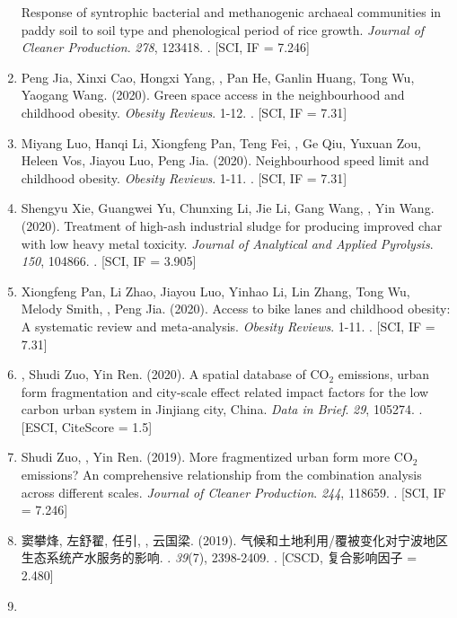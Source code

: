 \begin{enumerate}
    Response of syntrophic bacterial and methanogenic archaeal communities in paddy soil to soil type and phenological period of rice growth.
    \textit{Journal of Cleaner Production}. \textit{278}, 123418.
    . [SCI, IF = 7.246]
\item
    Peng Jia, Xinxi Cao, Hongxi Yang, \Shaoqing, Pan He, Ganlin Huang, Tong Wu, Yaogang Wang. (2020).
    Green space access in the neighbourhood and childhood obesity.
    \textit{Obesity Reviews}. 1-12.
    . [SCI, IF = 7.31]
\item
    Miyang Luo, Hanqi Li, Xiongfeng Pan, Teng Fei, \Shaoqing, Ge Qiu, Yuxuan Zou, Heleen Vos, Jiayou Luo, Peng Jia. (2020).
    Neighbourhood speed limit and childhood obesity.
    \textit{Obesity Reviews}. 1-11.
    . [SCI, IF = 7.31]
\item
    Shengyu Xie, Guangwei Yu, Chunxing Li, Jie Li, Gang Wang, \Shaoqing, Yin Wang. (2020).
    Treatment of high-ash industrial sludge for producing improved char with low heavy metal toxicity.
    \textit{Journal of Analytical and Applied Pyrolysis}. \textit{150}, 104866.
    . [SCI, IF = 3.905]
\item
    Xiongfeng Pan, Li Zhao, Jiayou Luo, Yinhao Li, Lin Zhang, Tong Wu, Melody Smith, \Shaoqing, Peng Jia. (2020).
    Access to bike lanes and childhood obesity: A systematic review and meta‐analysis.
    \textit{Obesity Reviews}. 1-11.
    . [SCI, IF = 7.31]
\item
    \Shaoqing, Shudi Zuo, Yin Ren. (2020).
    A spatial database of CO$_2$ emissions, urban form fragmentation and city-scale effect related impact factors for the low carbon urban system in Jinjiang city, China.
    \textit{Data in Brief}. \textit{29}, 105274.
    . [ESCI, CiteScore = 1.5]
\item
    Shudi Zuo, \Shaoqing, Yin Ren. (2019).
    More fragmentized urban form more CO$_2$ emissions? An comprehensive relationship from the combination analysis across different scales.
    \textit{Journal of Cleaner Production}. \textit{244}, 118659.
    . [SCI, IF = 7.246]
\item
    窦攀烽, 左舒翟, 任引, {}, 云国梁. (2019).
    气候和土地利用/覆被变化对宁波地区生态系统产水服务的影响.
    {}. \textit{39}(7), 2398-2409.
    . [CSCD, 复合影响因子 = 2.480] 
\item

\end{enumerate}
